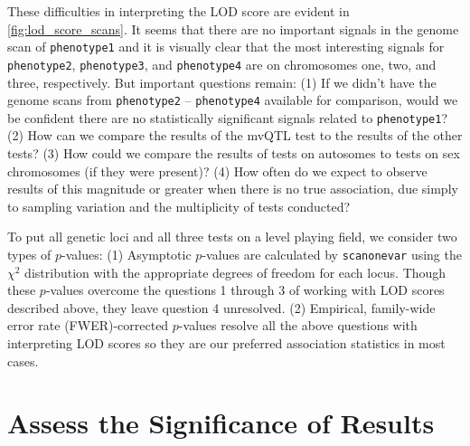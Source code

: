 \documentclass[9pt,twocolumn,twoside]{gsag3jnl}
\begin{document}

These difficulties in interpreting the LOD score are evident in \autoref{fig:lod_score_scans}.
It seems that there are no important signals in the genome scan of \texttt{phenotype1} and it is visually clear that the most interesting signals for \texttt{phenotype2}, \texttt{phenotype3}, and \texttt{phenotype4} are on chromosomes one, two, and three, respectively.
But important questions remain:
(1) If we didn't have the genome scans from \texttt{phenotype2} -- \texttt{phenotype4} available for comparison, would we be confident there are no statistically significant signals related to \texttt{phenotype1}?
(2) How can we compare the results of the mvQTL test to the results of the other tests?
(3) How could we compare the results of tests on autosomes to tests on sex chromosomes (if they were present)?
(4) How often do we expect to observe results of this magnitude or greater when there is no true association, due simply to sampling variation and the multiplicity of tests conducted?

To put all genetic loci and all three tests on a level playing field, we consider two types of $p$-values:
(1) Asymptotic $p$-values are calculated by \texttt{scanonevar} using the $\chi^2$ distribution with the appropriate degrees of freedom for each locus.
Though these $p$-values overcome the questions 1 through 3 of working with LOD scores described above, they leave question 4 unresolved.
(2) Empirical, family-wide error rate (FWER)-corrected $p$-values resolve all the above questions with interpreting LOD scores so they are our preferred association statistics in most cases.



\section*{Assess the Significance of Results}
\end{document}

